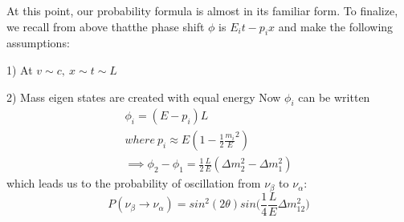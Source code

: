 \documentclass[12pt]{article}
\begin{document}
At this point, our probability formula is almost in its familiar form.  To finalize, we recall from above thatthe phase shift $\phi$ is $E_i t-p_i x$ and make the following assumptions:
\par 1) At $v\sim c,\ x\sim t\sim L$
\par 2) Mass eigen states are created with equal energy
Now $\phi_i$ can be written
\begin{equation}
\begin{split}
\phi_i = (E - p_i)L  
\\where \ p_i \approx E(1-\frac{1}{2}\frac{m_i}{E}^2)
\\ \implies \phi_2-\phi_1 = \frac{1}{2}\frac{L}{E}(\Delta m_2^2 - \Delta m_1^2)
\end{split}
\end{equation}
which leads us to the probability of oscillation from $\nu_\beta$ to $\nu_\alpha$:
\begin{equation}
P(\nu_\beta\rightarrow\nu_\alpha)=sin^2 (2\theta) sin\big(\frac{1}{4}\frac{L}{E}\Delta m_{12}^2\big)
\end{equation}
\end{document}
